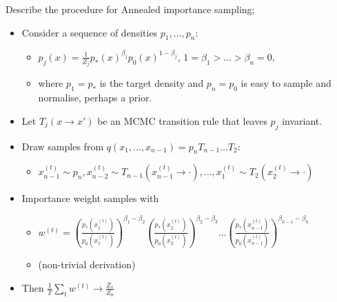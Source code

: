 \documentclass{article}
\begin{document}
Describe the procedure for Annealed importance sampling; \begin{itemize}
    \item Consider a sequence of densities $p_1, ..., p_n$: \begin{itemize}
        \item $p_j(x) = \frac{1}{Z_j}p_*(x)^{\beta_j}p_0(x)^{1-\beta_j}$, $1=\beta_1 > ... > \beta_n = 0$,
        \item where $p_1 = p_*$ is the target density and $p_n = p_0$ is easy to sample and normalise, perhaps a prior.
    \end{itemize}
    \item Let $T_j(x\rightarrow x')$ be an MCMC transition rule that leaves $p_j$ invariant.
    \item Draw samples from $q(x_1,...,x_{n-1}) = p_nT_{n-1}...T_2$: \begin{itemize}
        \item $x_{n-1}^{(t)}\sim p_n, x^{(t)}_{n-2} \sim T_{n-1}(x^{(t)}_{n-1}\rightarrow \cdot ), ..., x^{(t)}_1\sim T_2(x_2^{(t)}\rightarrow \cdot)$
    \end{itemize}
    \item Importance weight samples with \begin{itemize}
        \item $w^{(t)} = (\frac{p_*(x_1^{(t)})}{p_0(x_1^{(t)})})^{\beta_1-\beta_2}(\frac{p_*(x_2^{(t)})}{p_0(x_2^{(t)})})^{\beta_2-\beta_3}...(\frac{p_*(x_{n-1}^{(t)})}{p_0(x_{n-1}^{(t)})})^{\beta_{n-1}-\beta_n}$
        \item (non-trivial derivation)
    \end{itemize}
    \item Then $\frac{1}{T}\sum_t w^{(t)} \rightarrow \frac{Z_*}{Z_0}$
\end{itemize}


\end{document}

